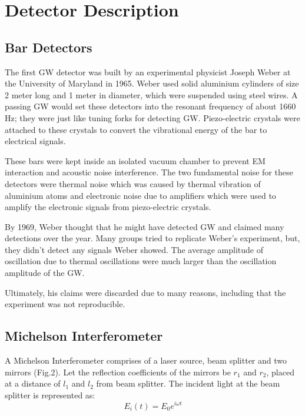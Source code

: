 \documentclass[conference]{IEEEtran}
\begin{document}
\section{Detector Description}
\subsection{Bar Detectors}
The first GW detector was built by an experimental physicist Joseph Weber at the University of Maryland in 1965. Weber used solid aluminium cylinders of size 2 meter long and 1 meter in diameter, which were suspended using steel wires. A passing GW would set these detectors into the resonant frequency of about 1660 Hz; they were just like tuning forks for detecting GW. Piezo-electric crystals were attached to these crystals to convert the vibrational energy of the bar to electrical signals\cite{Aguiar_2010}.

These bars were kept inside an isolated vacuum chamber to prevent EM interaction and acoustic noise interference. The two fundamental noise for these detectors were thermal noise which was caused by thermal vibration of aluminium atoms and electronic noise due to amplifiers which were used to amplify the electronic signals from piezo-electric crystals. 

By 1969, Weber thought that he might have detected GW and claimed many detections over the year. Many groups tried to replicate Weber's experiment, but, they didn't detect any signals Weber showed. The average amplitude of oscillation due to thermal oscillations were much larger than the oscillation amplitude of the GW.  

Ultimately, his claims were discarded due to many reasons, including that the experiment was not reproducible.

\subsection{Michelson Interferometer}
A Michelson Interferometer comprises of a laser source, beam splitter and two mirrors (Fig.2). Let the reflection coefficients of the mirrors be $r{_1}$ and $r{_2}$, placed at a distance of $l{_1}$ and $l{_2}$ from beam splitter. The incident light at the beam splitter is represented as\cite{Freise_2010}:
\begin{equation}
E_{i}(t) = E_{0}e^{i\omega t} 
\end{equation}
\end{document}
